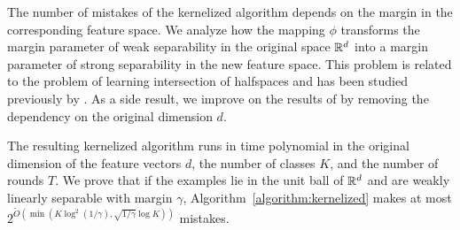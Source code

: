 The number of mistakes of the kernelized algorithm depends on the margin in the
corresponding feature space. We analyze how the mapping $\phi$ transforms the
margin parameter of weak separability in the original space $\mathbb{R}^d$ into a margin
parameter of strong separability in the new feature space. This problem is
related to the problem of learning intersection of halfspaces and has been
studied previously by \citet{Klivans-Servedio-2008}. As a side result, we
improve on the results of \citet{Klivans-Servedio-2008} by removing the
dependency on the original dimension $d$.

The resulting kernelized algorithm runs in time polynomial in the
original dimension of the feature vectors $d$, the number of classes $K$, and
the number of rounds $T$. We prove that if the examples lie in the unit ball of
$\mathbb{R}^d$ and are weakly linearly separable with margin $\gamma$,
Algorithm~\ref{algorithm:kernelized} makes at
most $2^{\widetilde{O}(\min(K \log^2 (1/\gamma), \sqrt{1/\gamma}
\log K))}$ mistakes.
